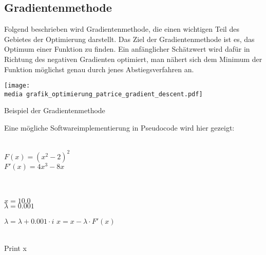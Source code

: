\subsection{Gradientenmethode}

Folgend beschrieben wird Gradientenmethode, die einen wichtigen Teil des Gebietes der Optimierung darstellt.
Das Ziel der Gradientenmethode ist es, das Optimum einer Funktion zu finden. Ein 
anfänglicher Schätzwert wird dafür in Richtung des negativen Gradienten 
optimiert, man nähert sich dem Minimum der Funktion möglichst genau durch jenes 
Abstiegsverfahren an.

\begin{dsafigure}
\begin{center}
\texttt{[image: \\media grafik\_optimierung\_patrice\_gradient\_descent.pdf]}
\label{figure:grafik_optimierung_patrice_gradient_descent}
\caption{Beispiel der Gradientenmethode}
\end{center}
\end{dsafigure}

Eine mögliche Softwareimplementierung in Pseudocode wird hier gezeigt:

\begin{algorithmic}[1]

   \\$F(x) = (x^2-2)^2$
\\$F'(x) = 4x^3-8x$

\\
\\$x = 10.0$
\\$\lambda = 0.001$

 \State $\lambda = \lambda+0.001\cdot i$
    \State $x = x - \lambda \cdot F'(x)$
  \EndFor
\EndFor
 
 
\\Print x\EndProcedure
\Statex
\end{algorithmic}

